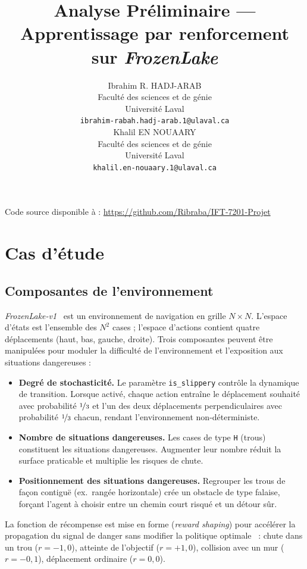 \documentclass{article}
\title{Analyse Préliminaire --- Apprentissage par renforcement sur \textit{FrozenLake}}
\author{
  Ibrahim R. HADJ-ARAB \\
  Faculté des sciences et de génie\\
  Université Laval\\
  \texttt{ibrahim-rabah.hadj-arab.1@ulaval.ca} \\
  \And
  Khalil EN NOUAARY \\
  Faculté des sciences et de génie\\
  Université Laval\\
  \texttt{khalil.en-nouaary.1@ulaval.ca} \\
}
\begin{document}
\maketitle

\noindent Code source disponible à : \url{https://github.com/Ribraba/IFT-7201-Projet}

\section{Cas d'étude}

\subsection{Composantes de l'environnement}

\textit{FrozenLake-v1}~\citep{towers2024} est un environnement de navigation en grille $N \times N$. L'espace d'états est l'ensemble des $N^2$ cases ; l'espace d'actions contient quatre déplacements (haut, bas, gauche, droite). Trois composantes peuvent être manipulées pour moduler la difficulté de l'environnement et l'exposition aux situations dangereuses :

\begin{itemize}
  \item \textbf{Degré de stochasticité.} Le paramètre \texttt{is\_slippery} contrôle la dynamique de transition. Lorsque activé, chaque action entraîne le déplacement souhaité avec probabilité $\nicefrac{1}{3}$ et l'un des deux déplacements perpendiculaires avec probabilité $\nicefrac{1}{3}$ chacun, rendant l'environnement non-déterministe.
  \item \textbf{Nombre de situations dangereuses.} Les cases de type \texttt{H} (trous) constituent les situations dangereuses. Augmenter leur nombre réduit la surface praticable et multiplie les risques de chute.
  \item \textbf{Positionnement des situations dangereuses.} Regrouper les trous de façon contiguë (ex.\ rangée horizontale) crée un obstacle de type falaise, forçant l'agent à choisir entre un chemin court risqué et un détour sûr.
\end{itemize}

La fonction de récompense est mise en forme (\textit{reward shaping}) pour accélérer la propagation du signal de danger sans modifier la politique optimale~\citep{ng1999} : chute dans un trou ($r = -1{,}0$), atteinte de l'objectif ($r = +1{,}0$), collision avec un mur ($r = -0{,}1$), déplacement ordinaire ($r = 0{,}0$).
\end{document}
